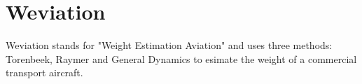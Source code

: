 \section{Weviation}
\label{sec:weviation}

Weviation stands for "Weight Estimation Aviation" and uses three methods: Torenbeek, Raymer and General Dynamics to esimate the weight of a commercial transport aircraft.
